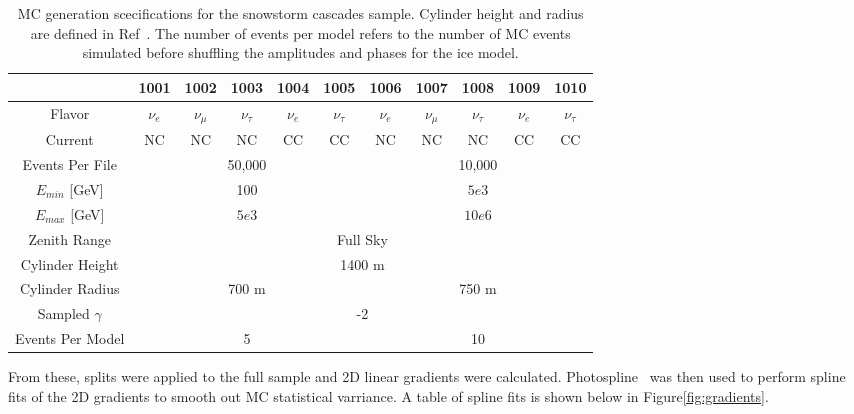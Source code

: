 \documentclass[main.tex]{subfiles}
\begin{document}
\begin{table}
    \centering
    \begin{tabular}{c | ccc ccc ccc c}\rowcolor{blue!25}
            & 1001 & 1002 & 1003 & 1004 & 1005 & 1006 & 1007 & 1008 & 1009 & 1010 \\\hline
        
    Flavor  &$\nu_{e}$ &$\nu_{\mu}$ &$\nu_{\tau}$ &$\nu_{e}$ &$\nu_{\tau}$ &$\nu_{e}$ &$\nu_{\mu}$ &$\nu_{\tau}$ &$\nu_{e}$ &$\nu_{\tau}$  \\
    Current & NC & NC & NC & CC & CC & NC & NC & NC & CC & CC \\
    Events Per File & \multicolumn{5}{c}{50,000} & \multicolumn{5}{c}{10,000} \\
    $E_{min}$ [GeV] & \multicolumn{5}{c}{100} & \multicolumn{5}{c}{$5e3$} \\
    $E_{max}$ [GeV] & \multicolumn{5}{c}{$5e3$} & \multicolumn{5}{c}{$10e6$}\\
    Zenith Range & \multicolumn{10}{c}{Full Sky}\\
    Cylinder Height & \multicolumn{10}{c}{1400 m}\\
    Cylinder Radius & \multicolumn{5}{c}{700 m} & \multicolumn{5}{c}{750 m} \\
    Sampled $\gamma$ & \multicolumn{10}{c}{-2} \\
    Events Per Model & \multicolumn{5}{c}{5} & \multicolumn{5}{c}{10} 
    \end{tabular}
    \caption{MC generation scecifications for the snowstorm cascades sample. Cylinder height and radius are defined in Ref~\cite{ABBASI2021108018}. The number of events per model refers to the number of MC events simulated before shuffling the amplitudes and phases for the ice model.}\label{table:mc}
\end{table}

From these, splits were applied to the full sample and 2D linear gradients were calculated. 
Photospline~\cite{WHITEHORN20132214} was then used to perform spline fits of the 2D gradients to smooth out MC statistical varriance. 
A table of spline fits is shown below in Figure\ref{fig:gradients}. 
\end{document}
